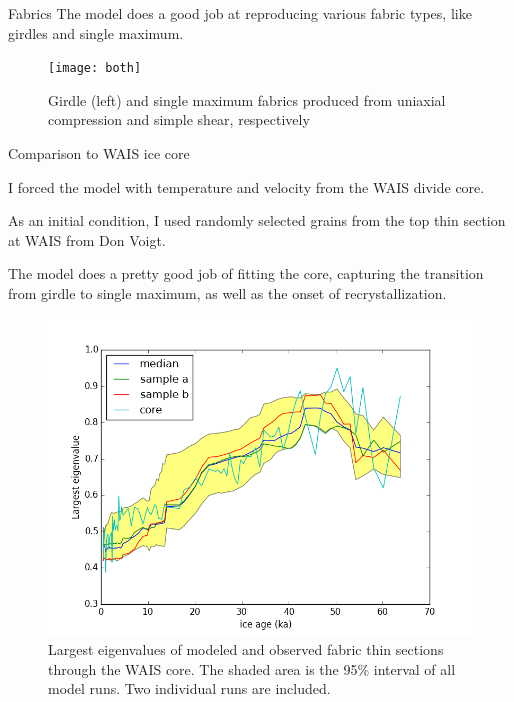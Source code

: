 \documentclass{beamer}
\begin{document}
\begin{frame}{Fabrics}
   The model does a good job at reproducing various fabric types, like girdles and single maximum.

\begin{figure}
   \texttt{[image: both]}
      \caption{\small{Girdle (left) and single maximum fabrics produced from uniaxial compression and simple shear, respectively}}
\end{figure}
\end{frame}

\begin{frame}{Comparison to WAIS ice core}
   \begin{itemize}
         \small{
      \item I forced the model with temperature and velocity from the WAIS divide core.
      \item As an initial condition, I used randomly selected grains from the top thin section at WAIS from Don Voigt.
      \item The model does a pretty good job of fitting the core, capturing the transition from girdle to single maximum, as well as the onset of recrystallization.
      }
   \end{itemize}
\end{frame}
\begin{frame}
   \begin{figure}
   \includegraphics[width=1\textwidth]{good_fit}
   \caption{Largest eigenvalues of modeled and observed fabric thin sections through the WAIS core. The shaded area is the 95\% interval of all model runs. Two individual runs are included.}
\end{figure}
\end{frame}
\end{document}
